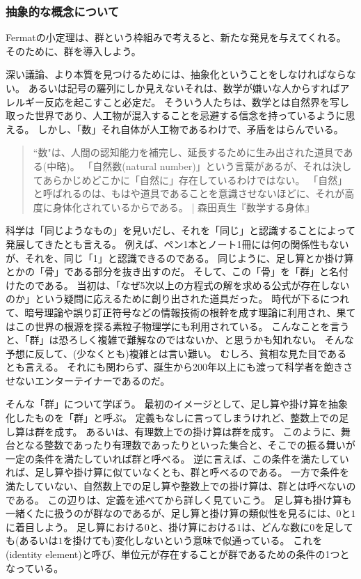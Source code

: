 \subsubsection{抽象的な概念について}
Fermatの小定理は、群という枠組みで考えると、新たな発見を与えてくれる。
そのために、群を導入しよう。

深い議論、より本質を見つけるためには、抽象化ということをしなければならない。
あるいは記号の羅列にしか見えないそれは、数学が嫌いな人からすればアレルギー反応を起こすこと必定だ。
そういう人たちは、数学とは自然界を写し取った世界であり、人工物が混入することを忌避する信念を持っているように思える。
しかし、「数」それ自体が人工物であるわけで、矛盾をはらんでいる。

\begin{quote}
``数"は、人間の認知能力を補完し、延長するために生み出された道具である(中略)。
「自然数(natural number)」という言葉があるが、それは決してあらかじめどこかに「自然に」存在しているわけではない。
「自然」と呼ばれるのは、もはや道具であることを意識させないほどに、それが高度に身体化されているからである。 | 森田真生『数学する身体』\cite{math_body}
\end{quote}

科学は「同じようなもの」を見いだし、それを「同じ」と認識することによって発展してきたとも言える。
例えば、ペン1本とノート1冊には何の関係性もないが、それを、同じ「1」と認識できるのである。
同じように、足し算とか掛け算とかの「骨」である部分を抜き出すのだ。
そして、この「骨」を「群」と名付けたのである。
当初は、「なぜ5次以上の方程式の解を求める公式が存在しないのか」という疑問に応えるために創り出された道具だった。
時代が下るにつれて、暗号理論や誤り訂正符号などの情報技術の根幹を成す理論に利用され、果てはこの世界の根源を探る素粒子物理学にも利用されている。
こんなことを言うと、「群」は恐ろしく複雑で難解なのではないか、と思うかも知れない。
そんな予想に反して、(少なくとも)複雑とは言い難い。
むしろ、貧相な見た目であるとも言える。
それにも関わらず、誕生から200年以上にも渡って科学者を飽きさせないエンターテイナーであるのだ。

そんな「群」について学ぼう。
最初のイメージとして、足し算や掛け算を抽象化したものを「群」と呼ぶ。
定義もなしに言ってしまうけれど、整数上での足し算は群を成す。
あるいは、有理数上での掛け算は群を成す。
このように、舞台となる整数であったり有理数であったりといった集合と、そこでの振る舞いが一定の条件を満たしていれば群と呼べる。
逆に言えば、この条件を満たしていれば、足し算や掛け算に似ていなくとも、群と呼べるのである。
一方で条件を満たしていない、自然数上での足し算や整数上での掛け算は、群とは呼べないのである。
この辺りは、定義を述べてから詳しく見ていこう。
足し算も掛け算も一緒くたに扱うのが群なのであるが、足し算と掛け算の類似性を見るには、$0$と$1$に着目しよう。
足し算における$0$と、掛け算における$1$は、どんな数に$0$を足しても(あるいは$1$を掛けても)変化しないという意味で似通っている。
これを(identity element)と呼び、単位元が存在することが群であるための条件の1つとなっている。


